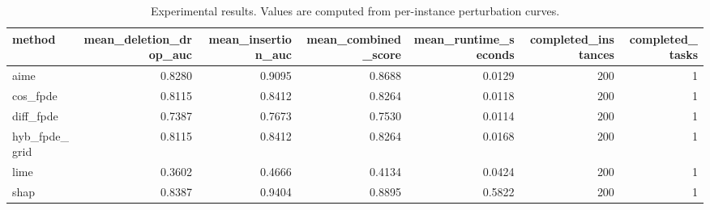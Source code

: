 \begin{table}[t]
\caption{Experimental results. Values are computed from per-instance perturbation curves.}
\label{tab:main_results_computed}
\centering
\begin{tabular}{lrrrrrr}
\toprule
method & mean\_deletion\_drop\_auc & mean\_insertion\_auc & mean\_combined\_score & mean\_runtime\_seconds & completed\_instances & completed\_tasks \\
\midrule
aime & 0.8280 & 0.9095 & 0.8688 & 0.0129 & 200 & 1 \\
cos\_fpde & 0.8115 & 0.8412 & 0.8264 & 0.0118 & 200 & 1 \\
diff\_fpde & 0.7387 & 0.7673 & 0.7530 & 0.0114 & 200 & 1 \\
hyb\_fpde\_grid & 0.8115 & 0.8412 & 0.8264 & 0.0168 & 200 & 1 \\
lime & 0.3602 & 0.4666 & 0.4134 & 0.0424 & 200 & 1 \\
shap & 0.8387 & 0.9404 & 0.8895 & 0.5822 & 200 & 1 \\
\bottomrule
\end{tabular}

\end{table}
